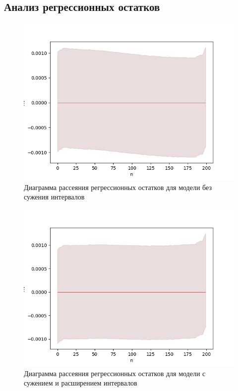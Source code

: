 \subsection{Анализ регрессионных остатков}

\begin{figure}[H]
	\begin{center}
		\includegraphics[scale = 0.55]{analysis_of_regression_residuals_1.png}
	\end{center}
	\caption{Диаграмма рассеяния регрессионных остатков для модели без сужения интервалов}
\end{figure}

\begin{figure}[H]
	\begin{center}
		\includegraphics[scale = 0.55]{analysis_of_regression_residuals_0.png}
	\end{center}
	\caption{Диаграмма рассеяния регрессионных остатков для модели с сужением и расширением интервалов}
\end{figure}

